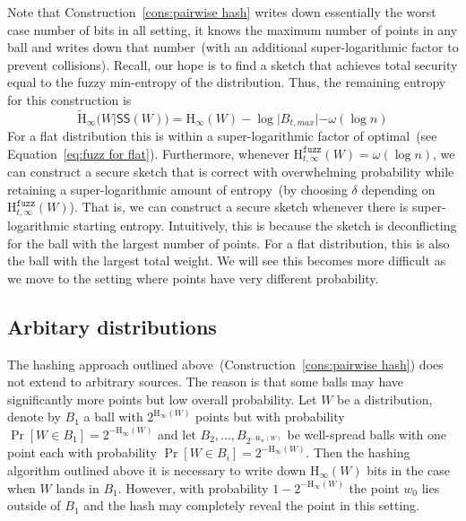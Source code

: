 \documentclass[11pt]{article}
\newcommand{\consref}[1]{\mbox{Construction~\ref{#1}}}
\newcommand{\class}[1]{{\ensuremath{\mathsf{#1}}}}
\newcommand{\sketch}{\ensuremath{\class{SS}}\xspace}
\newcommand{\dis}{\ensuremath{\mathsf{dis}}}
\newcommand{\Hoo}{\mathrm{H}_\infty}
\newcommand{\Hav}{\tilde{\mathrm{H}}_\infty}
\newcommand{\Hfuzz}{\mathrm{H}^{\mathtt{fuzz}}_{t,\infty}}
\begin{document}
Note that \consref{cons:pairwise hash} writes down essentially the worst case number of bits in all setting, it knows the maximum number of points in any ball and writes down that number~(with an additional super-logarithmic factor to prevent collisions).  Recall, our hope is to find a sketch that achieves total security equal to the fuzzy min-entropy of the distribution.  Thus, the remaining entropy for this construction is 
\[
\Hav(W |\sketch(W)) = \Hoo(W) - \log |B_{t, max}| - \omega(\log n)
\]
For a flat distribution this is within a super-logarithmic factor of optimal~(see Equation~\eqref{eq:fuzz for flat}).  Furthermore, whenever $\Hfuzz(W) = \omega(\log n)$, we can construct a secure sketch that is correct with overwhelming probability while retaining a super-logarithmic amount of entropy~(by choosing $\delta$ depending on $\Hfuzz(W)$).  That is, we can construct a secure sketch whenever there is super-logarithmic starting entropy.  Intuitively, this is because the sketch is deconflicting for the ball with the largest number of points.  For a flat distribution, this is also the ball with the largest total weight.  We will see this becomes more difficult as we move to the setting where points have very different probability.  %

\subsection{Arbitary distributions}
The hashing approach outlined above~(\consref{cons:pairwise hash}) does not extend to arbitrary sources.  The reason is that some balls may have significantly more points but low overall probability.  Let $W$ be a distribution, denote by $B_1$ a ball with $2^{\Hoo(W)}$ points but with probability $\Pr[W\in B_1] =2^{-\Hoo(W)}$ and let $B_2,..., B_{2^{-\Hoo(W)}}$ be well-spread balls with one point each with probability $\Pr[W\in B_i] = 2^{-\Hoo(W)}$.  Then the hashing algorithm outlined above it is necessary to write down $\Hoo(W)$ bits in the case when $W$ lands in $B_1$.  However, with probability $1-2^{-\Hoo(W)}$ the point $w_0$ lies outside of $B_1$ and the hash may completely reveal the point in this setting.  
\end{document}
